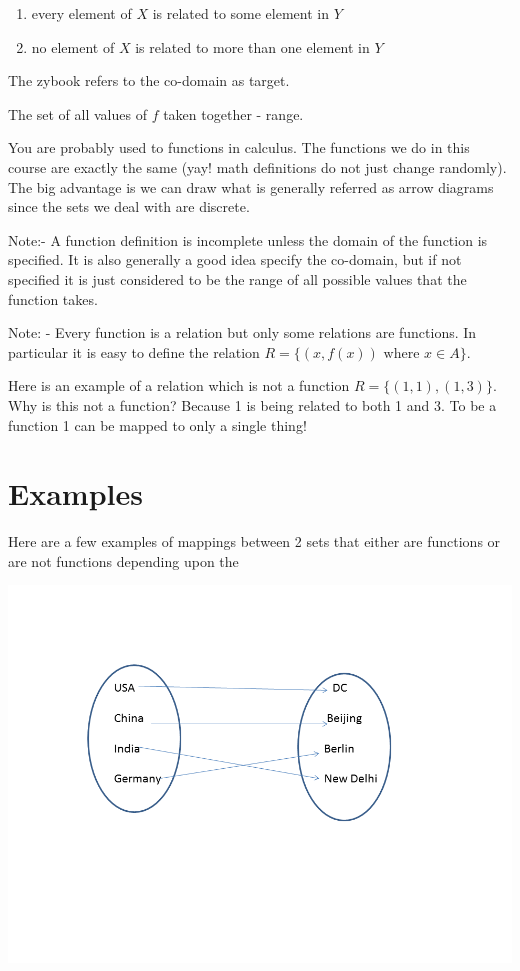 \documentclass[12pt]{article}
\begin{document}
\begin{enumerate}
\item every element of $X$ is related to some element in $Y$
\item no element of $X$ is related to more than one element in $Y$
\end{enumerate}

The zybook refers to the co-domain as target. 

The set of all values of  $f$ taken together - range. 

You are probably used to functions in calculus. The functions we do in this course are exactly the same (yay! math definitions do not just change randomly). The big advantage is we can draw what is generally referred as arrow diagrams since the sets we deal with are discrete.

Note:- A function definition is incomplete unless the domain of the function is specified. It is also generally a good idea specify the co-domain, but if not specified it is just considered to be the range of all possible values that the function takes.

Note: - Every function is a relation but only some relations are functions. In particular it is easy to define the relation $R = \{(x, f(x)) \text{ where }  x \in A \}$. 

Here is an example of a relation which is not a function $R = \{(1,1), (1,3)\}$. Why is this not a function? Because 1 is being related to both 1 and 3. To be a function 1 can be mapped to only a single thing!

\section*{Examples}

Here are a few examples of mappings between 2 sets that either are functions or are not functions depending upon the 

\includegraphics[scale=0.5]{func1.png}
\end{document}
